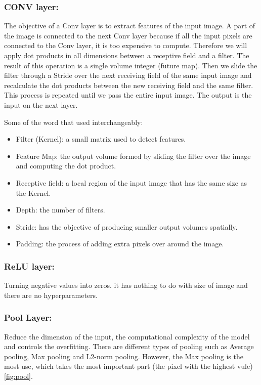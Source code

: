 \documentclass[12pt]{report}
\begin{document}
\subsubsection{CONV layer:}
The objective of a Conv layer is to extract features of the input image.
A part of the image is connected to the next Conv layer because if all the 
input pixels are connected to the Conv layer, it is too expensive to compute. 
Therefore we will apply dot products in all dimensions between a receptive 
field and a filter. The result of this operation is a single volume integer 
(future map).
Then we slide the filter through a Stride over the next receiving field of 
the same input image and recalculate the dot products between the new receiving
field and the same filter. This process is repeated until we pass the entire 
input image. The output is the input on the next layer.

Some of the word that used interchangeably:
\begin{itemize}
    \item Filter (Kernel): a small matrix used to detect features.
    \item Feature Map: the output volume formed by sliding the filter 
    over the image and computing the dot product.
    \item Receptive field: a local region of the input image that has 
    the same size as the Kernel.
    \item Depth: the number of filters.
    \item Stride: has the objective of producing smaller output volumes spatially.
    \item Padding: the process of adding extra pixels over around the image.
\end{itemize}

\subsubsection{ReLU layer:}
Turning negative values into zeros. it has nothing to do with 
size of image and there are no hyperparameters.
\subsubsection{Pool Layer:}
Reduce the dimension of the input, the computational complexity of 
the model and controls the overfitting. There are different types of
pooling such as Average pooling, Max pooling and L2-norm pooling.
However, the Max pooling is the most use, which takes the most important
part (the pixel with the highest vule)\ref{fig:pool}. 
\end{document}
